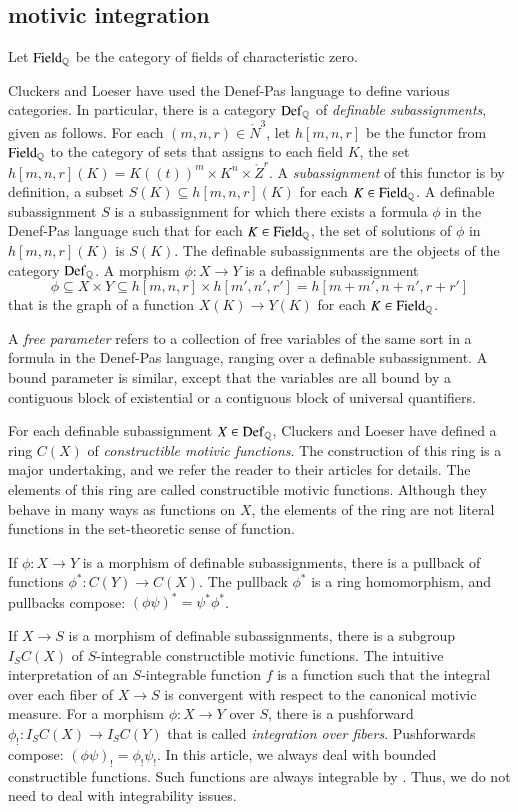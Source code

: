 \subsection{motivic integration}

Let ${\operatorname{Field}}_{\mathbb{Q}}$ be the category of fields of characteristic zero.

Cluckers and Loeser have used the Denef-Pas language to define various
categories.  In particular, there is a category ${\operatorname{Def}}_{\mathbb{Q}}$ of {\it
  definable subassignments}, given as follows.  For each
$(m,n,r)\in\ring{N}^3$, let $h[m,n,r]$ be the functor from
${\operatorname{Field}}_{\mathbb{Q}}$ to the category of sets that assigns to each field
$K$, the set $h[m,n,r](K)=K((t))^m\times K^n\times \ring{Z}^r$.  A
{\it subassignment} of this functor is by definition, a subset $S(K)
\subseteq h[m,n,r](K)$ for each $K\in{\operatorname{Field}}_{\mathbb{Q}}$.  A definable
subassignment $S$ is a subassignment for which there exists a formula
$\phi$ in the Denef-Pas language such that for each
$K\in{\operatorname{Field}}_{\mathbb{Q}}$, the set of solutions of $\phi$ in $h[m,n,r](K)$
is $S(K)$.  The definable subassignments are the objects of the
category ${\operatorname{Def}}_{\mathbb{Q}}$.  A morphism $\phi:X\to Y$ is a definable
subassignment
\[
\phi\subseteq X\times Y
\subseteq h[m,n,r]\times h[m',n',r'] = h[m+m',n+n',r+r']
\]
that is the graph of a function $X(K)\to Y(K)$ for each $K\in
{\operatorname{Field}}_{\mathbb{Q}}$.

A {\it free parameter} refers to a collection of free variables of the
same sort in a formula in the Denef-Pas language, ranging over a
definable subassignment.  A bound parameter is similar, except that
the variables are all bound by a contiguous block of existential or a
contiguous block of universal quantifiers.

For each definable subassignment $X\in {\operatorname{Def}}_{\mathbb{Q}}$, Cluckers and
Loeser have defined a ring $C(X)$ of {\it constructible motivic
  functions}.  The construction of this ring is a major undertaking,
and we refer the reader to their articles for details.  The elements
of this ring are called constructible motivic functions.  Although
they behave in many ways as functions on $X$, the elements of the ring
are not literal functions in the set-theoretic sense of function.

If $\phi:X\to Y$ is a morphism of definable subassignments, there is a
pullback of functions $\phi^*:C(Y)\to C(X)$.  The pullback $\phi^*$ is
a ring homomorphism, and pullbacks compose: $(\phi\psi)^* = \psi^*
\phi^*$.

If $X\to S$ is a morphism of definable subassignments, there is a
subgroup $I_S C(X)$ of $S$-integrable constructible motivic functions.
The intuitive interpretation of an $S$-integrable function $f$ is a
function such that the integral over each fiber of $X\to S$ is
convergent with respect to the canonical motivic measure.  For a
morphism $\phi: X\to Y$ over $S$, there is a pushforward
$\phi_!:I_SC(X)\to I_SC(Y)$ that is called {\it integration over
  fibers}.  Pushforwards compose: $(\phi\psi)_! = \phi_!\psi_!$.  In
this article, we always deal with bounded constructible functions.
Such functions are always integrable by
\cite[Prop~12.2.2]{cluckers2008constructible}.  Thus, we do not need
to deal with integrability issues.

